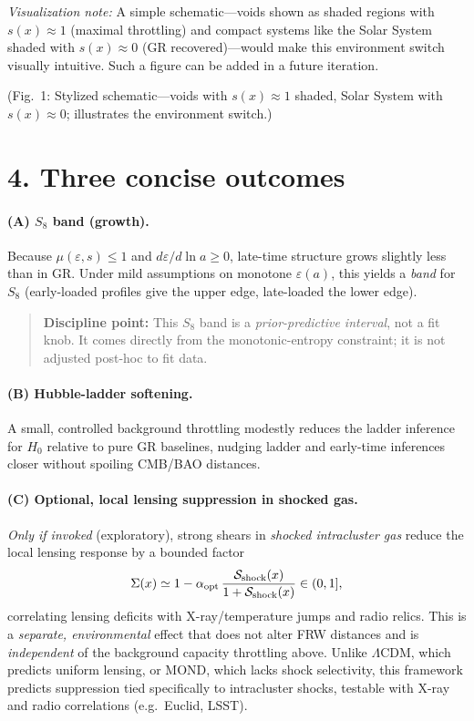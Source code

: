 \documentclass[aps,prd,onecolumn,superscriptaddress,nofootinbib]{revtex4-2}
\newcommand{\eps}{\varepsilon}
\newcommand{\Sig}{\Sigma}
\begin{document}
\medskip
\noindent\emph{Visualization note:} A simple schematic---voids shown as shaded regions with $s(x)\!\approx 1$ (maximal throttling) and compact systems like the Solar System shaded with $s(x)\!\approx 0$ (GR recovered)---would make this environment switch visually intuitive. Such a figure can be added in a future iteration.

\medskip
\noindent (Fig.~1: Stylized schematic---voids with $s(x)\!\approx 1$ shaded, Solar System with $s(x)\!\approx 0$; illustrates the environment switch.)

\section*{4. Three concise outcomes}
\paragraph*{(A) $S_8$ band (growth).}
Because $\mu(\eps,s)\!\le\!1$ and $d\eps/d\ln a\!\ge\!0$, late-time structure grows slightly less than in GR. Under mild assumptions on monotone $\eps(a)$, this yields a \emph{band} for $S_8$ (early-loaded profiles give the upper edge, late-loaded the lower edge). 
\begin{quote}
\textbf{Discipline point:} This $S_8$ band is a \emph{prior-predictive interval}, not a fit knob. It comes directly from the monotonic-entropy constraint; it is not adjusted post-hoc to fit data.
\end{quote}

\paragraph*{(B) Hubble-ladder softening.}
A small, controlled background throttling modestly reduces the ladder inference for $H_0$ relative to pure GR baselines, nudging ladder and early-time inferences closer without spoiling CMB/BAO distances.

\paragraph*{(C) Optional, local lensing suppression in shocked gas.}
\emph{Only if invoked} (exploratory), strong shears in \emph{shocked intracluster gas} reduce the local lensing response by a bounded factor
\[
\Sig(x)\simeq 1-\alpha_{\rm opt}\,\frac{\mathcal{S}_{\rm shock}(x)}{1+\mathcal{S}_{\rm shock}(x)} \in (0,1],
\]
correlating lensing deficits with X-ray/temperature jumps and radio relics. This is a \emph{separate, environmental} effect that does not alter FRW distances and is \emph{independent} of the background capacity throttling above.
Unlike $\Lambda$CDM, which predicts uniform lensing, or MOND, which lacks shock selectivity, this framework predicts suppression tied specifically to intracluster shocks, testable with X-ray and radio correlations (e.g.\ Euclid, LSST).
\end{document}
